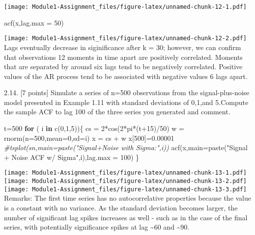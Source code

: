 \documentclass[
]{article}
\newenvironment{Shaded}{\begin{snugshade}}{\end{snugshade}}
\newcommand{\AttributeTok}[1]{\textcolor[rgb]{0.77,0.63,0.00}{#1}}
\newcommand{\CommentTok}[1]{\textcolor[rgb]{0.56,0.35,0.01}{\textit{#1}}}
\newcommand{\ControlFlowTok}[1]{\textcolor[rgb]{0.13,0.29,0.53}{\textbf{#1}}}
\newcommand{\DecValTok}[1]{\textcolor[rgb]{0.00,0.00,0.81}{#1}}
\newcommand{\FloatTok}[1]{\textcolor[rgb]{0.00,0.00,0.81}{#1}}
\newcommand{\FunctionTok}[1]{\textcolor[rgb]{0.00,0.00,0.00}{#1}}
\newcommand{\NormalTok}[1]{#1}
\newcommand{\OtherTok}[1]{\textcolor[rgb]{0.56,0.35,0.01}{#1}}
\newcommand{\SpecialCharTok}[1]{\textcolor[rgb]{0.00,0.00,0.00}{#1}}
\newcommand{\StringTok}[1]{\textcolor[rgb]{0.31,0.60,0.02}{#1}}
\begin{document}
\texttt{[image: Module1-Assignment\_files/figure-latex/unnamed-chunk-12-1.pdf]}

\begin{Shaded}
\begin{Highlighting}[]
\FunctionTok{acf}\NormalTok{(x,}\AttributeTok{lag.max =} \DecValTok{50}\NormalTok{)}
\end{Highlighting}
\end{Shaded}

\texttt{[image: Module1-Assignment\_files/figure-latex/unnamed-chunk-12-2.pdf]}
Lags eventually decrease in siginificance after k = 30; however, we can
confirm that observations 12 moments in time apart are positively
correlated. Moments that are separated by around six lags tend to be
negatively correlated. Positive values of the AR process tend to be
associated with negative values 6 lags apart.

2.14. {[}7 points{]} Simulate a series of n=500 observations from the
signal-plus-noise model presented in Example 1.11 with standard
deviations of 0,1,and 5.Compute the sample ACF to lag 100 of the three
series you generated and comment.

\begin{Shaded}
\begin{Highlighting}[]
\NormalTok{t}\OtherTok{=}\DecValTok{500}
\ControlFlowTok{for}\NormalTok{ ( i }\ControlFlowTok{in} \FunctionTok{c}\NormalTok{(}\DecValTok{0}\NormalTok{,}\DecValTok{1}\NormalTok{,}\DecValTok{5}\NormalTok{))\{}
\NormalTok{  cs }\OtherTok{=} \DecValTok{2}\SpecialCharTok{*}\FunctionTok{cos}\NormalTok{(}\DecValTok{2}\SpecialCharTok{*}\NormalTok{pi}\SpecialCharTok{*}\NormalTok{(t}\SpecialCharTok{+}\DecValTok{15}\NormalTok{)}\SpecialCharTok{/}\DecValTok{50}\NormalTok{)}
\NormalTok{  w }\OtherTok{=} \FunctionTok{rnorm}\NormalTok{(}\AttributeTok{n=}\DecValTok{500}\NormalTok{,}\AttributeTok{mean=}\DecValTok{0}\NormalTok{,}\AttributeTok{sd=}\NormalTok{i)}
\NormalTok{  x }\OtherTok{=}\NormalTok{ cs }\SpecialCharTok{+}\NormalTok{ w }
\NormalTok{  x[}\DecValTok{500}\NormalTok{]}\OtherTok{=}\FloatTok{0.00001}
  \CommentTok{\#tsplot(sn,main=paste("Signal+Noise with Sigma:",i))}
  \FunctionTok{acf}\NormalTok{(x,}\AttributeTok{main=}\FunctionTok{paste}\NormalTok{(}\StringTok{"Signal + Noise ACF w/ Sigma"}\NormalTok{,i),}\AttributeTok{lag.max =} \DecValTok{100}\NormalTok{)}
\NormalTok{\}}
\end{Highlighting}
\end{Shaded}

\texttt{[image: Module1-Assignment\_files/figure-latex/unnamed-chunk-13-1.pdf]}
\texttt{[image: Module1-Assignment\_files/figure-latex/unnamed-chunk-13-2.pdf]}
\texttt{[image: Module1-Assignment\_files/figure-latex/unnamed-chunk-13-3.pdf]}
Remarks: The first time series has no autocorrelative properties because
the value is a constant with no variance. As the standard deviation
becomes larger, the number of significant lag spikes increases as well -
such as in the case of the final series, with potentially significance
spikes at lag \textasciitilde60 and \textasciitilde90.
\end{document}
